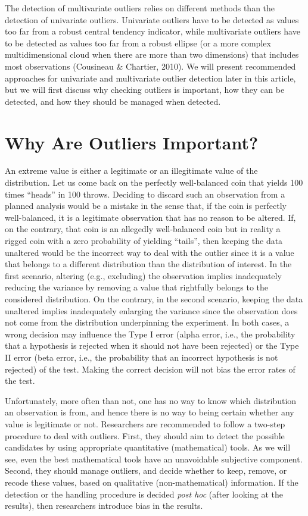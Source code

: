 \documentclass[man,floatsintext]{apa6}
\begin{document}
The detection of multivariate outliers relies on different methods than the detection of univariate outliers. Univariate outliers have to be detected as values too far from a robust central tendency indicator, while multivariate outliers have to be detected as values too far from a robust ellipse (or a more complex multidimensional cloud when there are more than two dimensions) that includes most observations (Cousineau \& Chartier, 2010). We will present recommended approaches for univariate and multivariate outlier detection later in this article, but we will first discuss why checking outliers is important, how they can be detected, and how they should be managed when detected.

\hypertarget{why-are-outliers-important}{%
\section{Why Are Outliers Important?}\label{why-are-outliers-important}}

An extreme value is either a legitimate or an illegitimate value of the distribution. Let us come back on the perfectly well-balanced coin that yields 100 times \enquote{heads} in 100 throws. Deciding to discard such an observation from a planned analysis would be a mistake in the sense that, if the coin is perfectly well-balanced, it is a legitimate observation that has no reason to be altered. If, on the contrary, that coin is an allegedly well-balanced coin but in reality a rigged coin with a zero probability of yielding \enquote{tails}, then keeping the data unaltered would be the incorrect way to deal with the outlier since it is a value that belongs to a different distribution than the distribution of interest. In the first scenario, altering (e.g., excluding) the observation implies inadequately reducing the variance by removing a value that rightfully belongs to the considered distribution. On the contrary, in the second scenario, keeping the data unaltered implies inadequately enlarging the variance since the observation does not come from the distribution underpinning the experiment. In both cases, a wrong decision may influence the Type I error (alpha error, i.e., the probability that a hypothesis is rejected when it should not have been rejected) or the Type II error (beta error, i.e., the probability that an incorrect hypothesis is not rejected) of the test. Making the correct decision will not bias the error rates of the test.

Unfortunately, more often than not, one has no way to know which distribution an observation is from, and hence there is no way to being certain whether any value is legitimate or not. Researchers are recommended to follow a two-step procedure to deal with outliers. First, they should aim to detect the possible candidates by using appropriate quantitative (mathematical) tools. As we will see, even the best mathematical tools have an unavoidable subjective component. Second, they should manage outliers, and decide whether to keep, remove, or recode these values, based on qualitative (non-mathematical) information. If the detection or the handling procedure is decided \emph{post hoc} (after looking at the results), then researchers introduce bias in the results.
\end{document}
